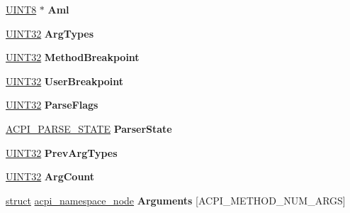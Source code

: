 \begin{DoxyCompactItemize}
\item 
\mbox{\label{structacpi__walk__state_a07292dc3a35a373d82d5d43874e84d7a}} 
\hyperlink{_processor_bind_8h_ab27e9918b538ce9d8ca692479b375b6a}{U\+I\+N\+T8} $\ast$ {\bfseries Aml}
\item 
\mbox{\label{structacpi__walk__state_a26bf234a8986dae48e820746a1959c93}} 
\hyperlink{_processor_bind_8h_ae1e6edbbc26d6fbc71a90190d0266018}{U\+I\+N\+T32} {\bfseries Arg\+Types}
\item 
\mbox{\label{structacpi__walk__state_a35f045643449f65b59b7df537ed09214}} 
\hyperlink{_processor_bind_8h_ae1e6edbbc26d6fbc71a90190d0266018}{U\+I\+N\+T32} {\bfseries Method\+Breakpoint}
\item 
\mbox{\label{structacpi__walk__state_a4640016591bda2aff54fcb0e188f2c47}} 
\hyperlink{_processor_bind_8h_ae1e6edbbc26d6fbc71a90190d0266018}{U\+I\+N\+T32} {\bfseries User\+Breakpoint}
\item 
\mbox{\label{structacpi__walk__state_a9719dbb98d9ceff24dfb84d461bdd2a1}} 
\hyperlink{_processor_bind_8h_ae1e6edbbc26d6fbc71a90190d0266018}{U\+I\+N\+T32} {\bfseries Parse\+Flags}
\item 
\mbox{\label{structacpi__walk__state_afd554ff23f6d27c5ff900dc1df70593f}} 
\hyperlink{structacpi__parse__state}{A\+C\+P\+I\+\_\+\+P\+A\+R\+S\+E\+\_\+\+S\+T\+A\+TE} {\bfseries Parser\+State}
\item 
\mbox{\label{structacpi__walk__state_a4a3b9147ea56e96131b734d3d7f28d0f}} 
\hyperlink{_processor_bind_8h_ae1e6edbbc26d6fbc71a90190d0266018}{U\+I\+N\+T32} {\bfseries Prev\+Arg\+Types}
\item 
\mbox{\label{structacpi__walk__state_a748e5c30a172bb3e376a72e576227845}} 
\hyperlink{_processor_bind_8h_ae1e6edbbc26d6fbc71a90190d0266018}{U\+I\+N\+T32} {\bfseries Arg\+Count}
\item 
\mbox{\label{structacpi__walk__state_af0a12f0e9ca6e6be30514490dd9647b5}} 
\hyperlink{interfacestruct}{struct} \hyperlink{structacpi__namespace__node}{acpi\+\_\+namespace\+\_\+node} {\bfseries Arguments} \mbox{[}A\+C\+P\+I\+\_\+\+M\+E\+T\+H\+O\+D\+\_\+\+N\+U\+M\+\_\+\+A\+R\+GS\mbox{]}

\end{DoxyCompactItemize}
